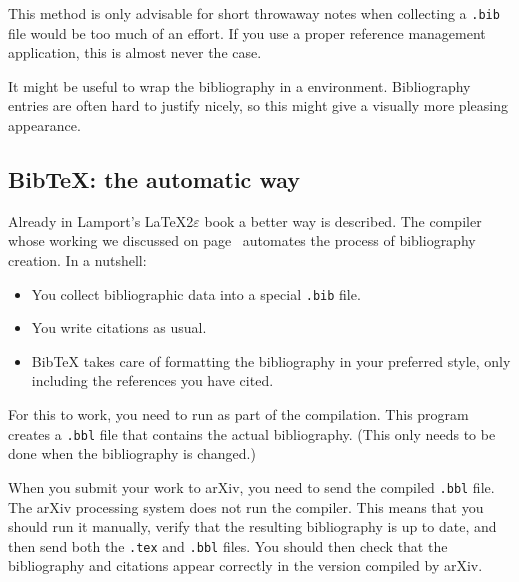 \begin{practices}
This method is only advisable for short throwaway notes
when collecting a \verb|.bib| file would be too much of an effort.
If you use a proper reference management application,
this is almost never the case.
\end{practices}

\begin{technote}
It might be useful to wrap the bibliography in a  environment.
Bibliography entries are often hard to justify nicely,
so this might give a visually more pleasing appearance.
\end{technote}



%
\subsection{BibTeX: the automatic way}

Already in Lamport's \LaTeX2$\varepsilon$ book \cite{lamport} a better way is described.
The  compiler whose working we discussed on page~\pageref{bibtex process}
automates the process of bibliography creation.
In a nutshell:
\begin{itemize}
\item You collect bibliographic data into a special \verb|.bib| file.
\item You write citations as usual.
\item BibTeX takes care of formatting the bibliography in your preferred style,
    only including the references you have cited.
\end{itemize}
%
For this to work, you need to run  as part of the compilation.
This program creates a \verb|.bbl| file that contains the actual bibliography.
(This only needs to be done when the bibliography is changed.)

\begin{remark}
When you submit your work to arXiv, you need to send the compiled \verb|.bbl| file.
The arXiv processing system does not run the  compiler.
This means that you should run it manually,
verify that the resulting bibliography is up to date,
and then send both the \verb|.tex| and \verb|.bbl| files.
You should then check that the bibliography and citations
appear correctly in the version compiled by arXiv.
\end{remark}

